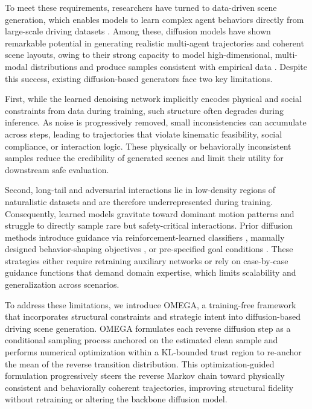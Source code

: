 \documentclass[10pt,twocolumn,letterpaper]{article}
\theoremstyle{plain}
\theoremstyle{remark}
\begin{document}
To meet these requirements, researchers have turned to data-driven scene generation, which enables models to learn complex agent behaviors directly from large-scale driving datasets \cite{hu2024solving,seff2023motionlm,feng2022trafficgen}. Among these, diffusion models have shown remarkable potential in generating realistic multi-agent trajectories and coherent scene layouts, owing to their strong capacity to model high-dimensional, multi-modal distributions and produce samples consistent with empirical data \cite{jiang2024scenediffuser,huang2024versatile}. Despite this success, existing diffusion-based generators face two key limitations.

First, while the learned denoising network implicitly encodes physical and social constraints from data during training, such structure often degrades during inference. As noise is progressively removed, small inconsistencies can accumulate across steps, leading to trajectories that violate kinematic feasibility, social compliance, or interaction logic. These physically or behaviorally inconsistent samples reduce the credibility of generated scenes and limit their utility for downstream safe evaluation.

Second, long-tail and adversarial interactions lie in low-density regions of naturalistic datasets and are therefore underrepresented during training. Consequently, learned models gravitate toward dominant motion patterns and struggle to directly sample rare but safety-critical interactions. Prior diffusion methods introduce guidance via reinforcement-learned classifiers \cite{xie2024advdiffuser}, manually designed behavior-shaping objectives \cite{xu2025diffscene, zhong2022guided}, or pre-specified goal conditions \cite{zhou2025decoupled, jiang2023motiondiffuser}. These strategies either require retraining auxiliary networks or rely on case-by-case guidance functions that demand domain expertise, which limits scalability and generalization across scenarios.

To address these limitations, we introduce OMEGA, a training-free framework that incorporates structural constraints and strategic intent into diffusion-based driving scene generation. OMEGA formulates each reverse diffusion step as a conditional sampling process anchored on the estimated clean sample and performs numerical optimization within a KL-bounded trust region to re-anchor the mean of the reverse transition distribution. This optimization-guided formulation progressively steers the reverse Markov chain toward physically consistent and behaviorally coherent trajectories, improving structural fidelity without retraining or altering the backbone diffusion model.
\end{document}
